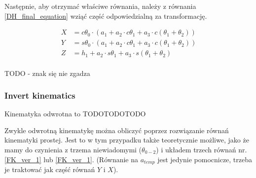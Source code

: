 \documentclass[a4paper,13pt]{article}
\begin{document}

Następnie, aby otrzymać właściwe równania, należy z równania \ref{DH_final_equation} wziąć część odpowiedzialną za transformację.

\begin{equation} \label{FK_ver_2}
\begin{split}
X &= c\theta_0 \cdot \left( a_1 + a_2 \cdot c\theta_1 + a_3  \cdot c\left( \theta_1 + \theta_2 \right) \right)\\
Y &= s\theta_0 \cdot \left( a_1 + a_2 \cdot c\theta_1 + a_3  \cdot c\left( \theta_1 + \theta_2 \right) \right)\\
Z &= h_1 + a_2 \cdot s\theta_1 + a_3 \cdot s\left( \theta_1 + \theta_2 \right)\\
\end{split}
\end{equation}

TODO - znak się nie zgadza



\subsubsection{Invert kinematics}
Kinematyka odwrotna to TODOTODOTODO

Zwykle odwrotną kinematykę można obliczyć poprzez rozwiązanie równań kinematyki prostej. Jest to w tym przypadku także teoretycznie możliwe, jako że mamy do czynienia z trzema niewiadomymi ($\theta_{0-2}$) i układem trzech równań nr. \ref{FK_ver_1} lub \ref{FK_ver_1}. (Równanie na $a_{temp}$ jest jedynie pomocnicze, trzeba je traktować jak część równań $Y$ i $X$).
\end{document}
